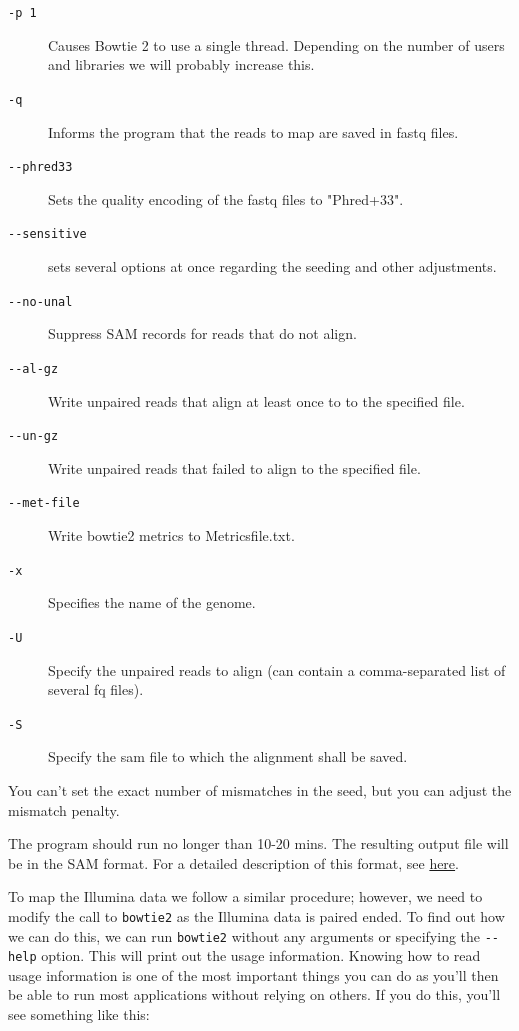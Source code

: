 \documentclass[11pt]{article}
\begin{document}
\begin{description}
\item[{\texttt{-p 1}}] Causes Bowtie 2 to use a single thread.
Depending on the number of users and libraries we will  probably increase this.
\item[{\texttt{-q}}] Informs the program that the reads to map are saved in fastq files.
\item[{\texttt{-{}-phred33}}] Sets the quality encoding of the fastq files to  "Phred+33".
\item[{\texttt{-{}-sensitive}}] sets several options at once regarding the seeding and other adjustments.
\item[{\texttt{-{}-no-unal}}] Suppress SAM records for reads that do not align.
\item[{\texttt{-{}-al-gz}}] Write unpaired reads that align at least once to to the specified file.
\item[{\texttt{-{}-un-gz}}] Write unpaired reads that failed to align to the specified file.
\item[{\texttt{-{}-met-file}}] Write bowtie2 metrics to Metricsfile.txt.
\item[{\texttt{-x}}] Specifies the name of the genome.
\item[{\texttt{-U}}] Specify the unpaired reads to align (can contain a comma-separated list of several fq files).
\item[{\texttt{-S}}] Specify the sam file to which the alignment shall be saved.
\end{description}

You can't set the exact number of mismatches in the seed, but you can
adjust the mismatch penalty.  

The program should run no longer than 10-20 mins. The resulting output file will be
in the SAM format. For a detailed description of this format, see \href{https://samtools.github.io/hts-specs/SAMv1.pdf}{here}.

To map the Illumina data we follow a similar procedure; however, we need to
modify the call to \texttt{bowtie2} as the Illumina data is paired ended. To find
out how we can do this, we can run \texttt{bowtie2} without any arguments or
specifying the \texttt{-{}-help} option. This will
print out the usage information. Knowing how to read usage information is one
of the most important things you can do as you'll then be able to run most
applications without relying on others. If you do this, you'll see something
like this:
\end{document}
